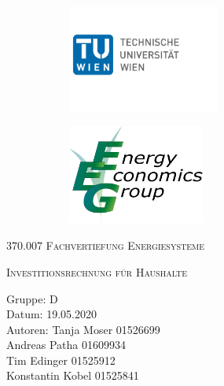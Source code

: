\documentclass[a4paper,12pt]{article}
\begin{document}
	\begin{titlepage}
		\begin{figure}[h]
			\begin{subfigure}{1cm}
				\includegraphics[width=5cm]{img/TU_Logo}
			\end{subfigure}
			\hspace{10cm}
			\begin{subfigure}{6cm}
				\includegraphics[width=4.5cm]{img/EEG_logo}
			\end{subfigure}
		\end{figure}
		\centering
		\bigskip \bigskip \bigskip \bigskip \bigskip
		\scshape\LARGE 370.007 Fachvertiefung Energiesysteme\par
		\vspace{1cm}
		\scshape\Large Investitionsrechnung für Haushalte \par
		\vspace{8cm}
		\raggedright
		\large Gruppe: D \\
		Datum: 19.05.2020 \\
		Autoren: Tanja Moser 01526699\\
		\hspace{2.4cm} Andreas Patha 01609934\\
		\hspace{2.4cm} Tim Edinger 01525912\\
		\hspace{2.4cm} Konstantin Kobel 01525841\\
		\vfill
		\large \par
	\end{titlepage}
\end{document}
